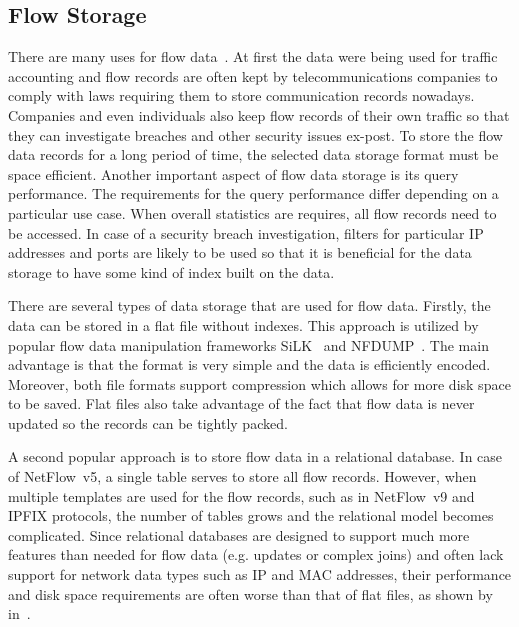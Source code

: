 \subsection{Flow Storage}\label{subsec:flow-storage}

There are many uses for flow data~\cite{Li-2013-Review, Umer-2017-Flow}. At first the data were being used for traffic accounting and flow records are often kept by telecommunications companies to comply with laws requiring them to store communication records nowadays. Companies and even individuals also keep flow records of their own traffic so that they can investigate breaches and other security issues ex-post. To store the flow data records for a long period of time, the selected data storage format must be space efficient. Another important aspect of flow data storage is its query performance. The requirements for the query performance differ depending on a particular use case. When overall statistics are requires, all flow records need to be accessed. In case of a security breach investigation, filters for particular IP addresses and ports are likely to be used so that it is beneficial for the data storage to have some kind of index built on the data.

There are several types of data storage that are used for flow data. Firstly, the data can be stored in a flat file without indexes. This approach is utilized by popular flow data manipulation frameworks SiLK~\cite{Shimeall-2014-Using} and NFDUMP~\cite{Haag-2014-NFDUMP}. The main advantage is that the format is very simple and the data is efficiently encoded. Moreover, both file formats support compression which allows for more disk space to be saved. Flat files also take advantage of the fact that flow data is never updated so the records can be tightly packed.

A second popular approach is to store flow data in a relational database. In case of NetFlow~v5, a single table serves to store all flow records. However, when multiple templates are used for the flow records, such as in NetFlow~v9 and IPFIX protocols, the number of tables grows and the relational model becomes complicated. Since relational databases are designed to support much more features than needed for flow data (e.g. updates or complex joins) and often lack support for network data types such as IP and MAC addresses, their performance and disk space requirements are often worse than that of flat files, as shown by \citeauthor{Hofstede-2010-Network} in~\cite{Hofstede-2010-Network}.

